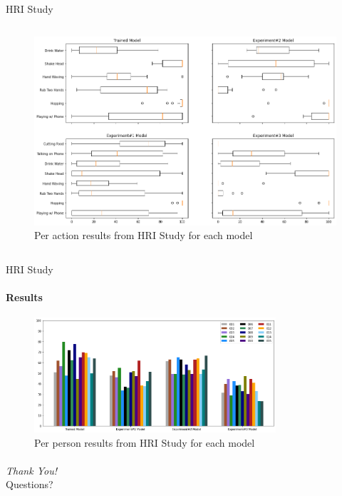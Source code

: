 \documentclass[aspectratio=169, xcolor=dvipsnames]{beamer}
\begin{document}
\begin{frame}{HRI Study}
\begin{columns}
      \begin{figure}[ht!]
            \centering
            \includegraphics[width=\textwidth]{images/hri_boxplots.png}
            \caption{Per action results from HRI Study for each model}
      \end{figure} 
      \end{columns}
\end{frame}

\begin{frame}{HRI Study}
      \framesubtitle{Results}%
      
      \begin{figure}[ht!]
            \centering
            \includegraphics[width=0.8\textwidth]{images/hri_barplots.png}
            \caption{Per person results from HRI Study for each model}
      \end{figure} 
\end{frame}

\begin{frame}
      \framesubtitle{}%
      
      \vspace{1.25cm}
      \centering
      \Huge
      \emph{Thank You!}\\
      \vspace{0.25cm}
      \large
      Questions?
\end{frame}
\end{document}
